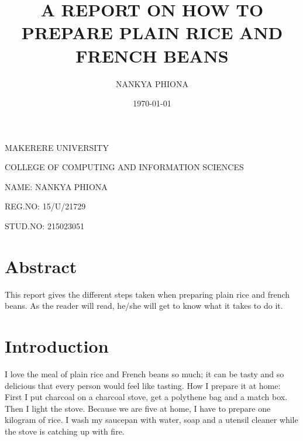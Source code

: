 \documentclass[14pt]{article}
\begin{document}
\begin{center}\begin{Huge} MAKERERE UNIVERSITY\end{Huge}\end{center}

\begin{Huge} COLLEGE OF COMPUTING AND INFORMATION SCIENCES \end{Huge}


\begin{flushleft}\begin{huge} NAME: NANKYA PHIONA \end{huge}\end{flushleft}
\begin{flushleft}\begin{huge} REG.NO: 15/U/21729 \end{huge}\end{flushleft}
\begin{flushleft}\begin{huge} STUD.NO: 215023051 \end{huge}\end{flushleft}

\title{A REPORT ON HOW TO PREPARE PLAIN RICE AND FRENCH BEANS}

\author{NANKYA PHIONA}

\date{\today}

\maketitle

\tableofcontents

\section{Abstract}

This report gives the different steps taken when preparing plain rice and french beans. As the reader will read, he/she will get to know what it takes to do it.

\section{Introduction}

I love the meal of plain rice and French beans so much; it can be tasty and so delicious that every person would feel like tasting.
How I prepare it at home:
First I put charcoal on a charcoal stove, get a polythene bag and a match box. Then I light the stove. Because we are five at home, I have to prepare one kilogram of rice. I wash my saucepan with water, soap and a utensil cleaner while the stove is catching up with fire.
\end{document}
